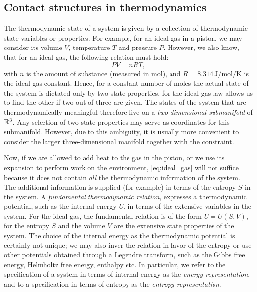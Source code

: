 \subsection{Contact structures in thermodynamics} 
The thermodynamic state of a system is given by a collection of thermodynamic state variables or properties. For example, for an ideal gas in a piston, we may consider its volume $V$, temperature $T$ and pressure $P$. However, we also know, that for an ideal gas, the following relation must hold:
\begin{equation}
    PV = nRT,
    \label{eq:ideal_gas}
\end{equation}
with $n$ is the amount of substance (measured in \si{\mole}), and $R = \SI{8.314}{\joule \per \mole \per \kelvin}$ is the ideal gas constant.  Hence, for a constant number of moles the actual state of the system is dictated only by two state properties, for the ideal gas law allows us to find the other if two out of three are given. The states of the system that are thermodynamically meaningful therefore live on a \emph{two-dimensional submanifold} of $\mathbb{R}^3$. Any selection of two state properties may serve as coordinates for this submanifold. However, due to this ambiguity, it is usually more convenient to consider the larger three-dimensional manifold together with the constraint.  \cite{Balian2001, Giancoli2014}

Now, if we are allowed to add heat to the gas in the piston, or we use its expansion to perform work on the environment, \cref{eq:ideal_gas} will not suffice because it does not contain \emph{all} the thermodynamic information of the system. The additional information is supplied (for example) in terms of the entropy $S$ in the system. A \emph{fundamental thermodynamic relation}, expresses a thermodynamic potential, such as the internal energy $U$, in terms of the extensive variables in the system. For the ideal gas, the fundamental relation is of the form $U = U(S, V)$, for the entropy $S$ and the volume $V$ are the extensive state properties of the system. The choice of the internal energy as the thermodynamic potential is certainly not unique; we may also inver the relation in favor of the entropy or use other potentials obtained through a Legendre transform, such as the Gibbs free energy, Helmholtz free energy, enthalpy etc. In particular, we refer to the specification of a system in terms of internal energy as the \emph{energy representation}, and to a specification in terms of entropy as the \emph{entropy representation}. \cite{VanderSchaft2021a}

